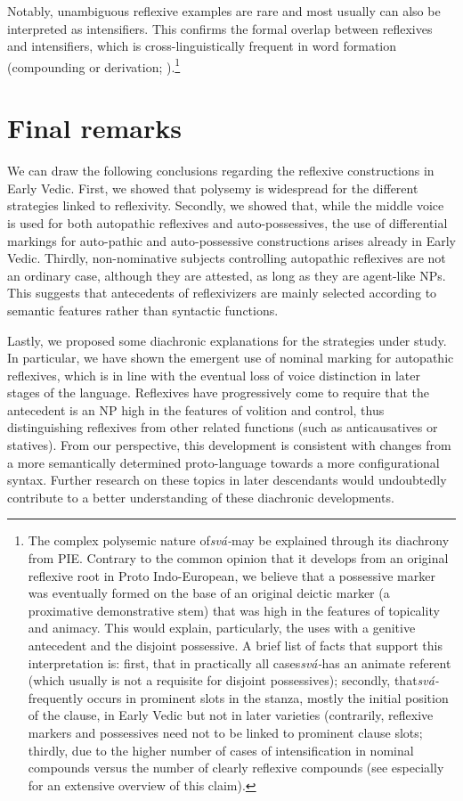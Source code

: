 \documentclass[output=paper]{langscibook}
\begin{document}
{Notably, unambiguous reflexive examples are rare and most usually can also be interpreted as intensifiers. This confirms the formal overlap between reflexives and intensifiers, which is cross-linguistically frequent in word formation (compounding or derivation; \citealt{Koenig2011}).}\footnote{{The complex polysemic nature of}{\textit{svá-}}{may be explained through its diachrony from PIE. Contrary to the common opinion that it develops from an original reflexive root in Proto Indo-European, we believe that a possessive marker was eventually formed on the base of an original deictic marker (a proximative demonstrative stem) that was high in the features of topicality and animacy. This would explain, particularly, the uses with a genitive antecedent and the disjoint possessive. A brief list of facts that support this interpretation is: first, that in practically all cases}{\textit{svá-}}{has an animate referent (which usually is not a requisite for disjoint possessives); secondly, that}{\textit{svá-} }{frequently occurs in prominent slots in the stanza, mostly the initial position of the clause, in Early Vedic but not in later varieties (contrarily, reflexive markers and possessives need not to be linked to prominent clause slots; thirdly, due to the higher number of cases of intensification in nominal compounds versus the number of clearly reflexive compounds (see especially \citealt{Orqueda2017} for an extensive overview of this claim).}}


\section{Final remarks}
\label{sec:Orqueda:3}


We can draw the following conclusions regarding the reflexive constructions in Early Vedic. First, we showed that polysemy is widespread for the different strategies linked to reflexivity. Secondly, we showed that, while the middle voice is used for both autopathic reflexives and auto-possessives, the use of differential markings for auto-pathic and auto-possessive constructions arises already in Early Vedic. Thirdly, non-nominative subjects controlling autopathic reflexives are not an ordinary case, although they are attested, as long as they are agent-like NPs. This suggests that antecedents of reflexivizers are mainly selected according to semantic features rather than syntactic functions.

{Lastly, we proposed some diachronic explanations for the strategies under study. In particular, we have shown the emergent use of nominal marking for autopathic reflexives, which is in line with the eventual loss of voice distinction in later stages of the language. Reflexives have progressively come to require that the antecedent is an NP high in the features of volition and control, thus distinguishing reflexives from other related functions (such as anticausatives or statives). From our perspective, this development is consistent with changes from a more semantically determined proto-language towards a more configurational syntax. Further research on these topics in later descendants would undoubtedly contribute to a better understanding of these diachronic developments.}
\end{document}
